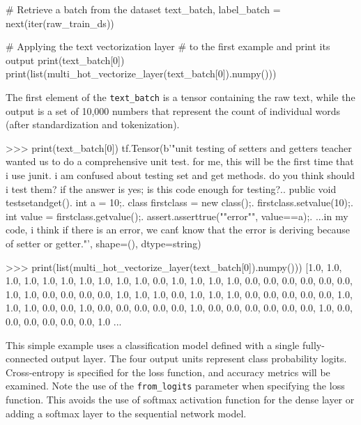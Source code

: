\begin{samepage}
\begin{pythoncode}
# Retrieve a batch from the dataset
text_batch, label_batch = next(iter(raw_train_ds))

# Applying the text vectorization layer
# to the first example and print its output
print(text_batch[0])
print(list(multi_hot_vectorize_layer(text_batch[0]).numpy()))
\end{pythoncode}
\end{samepage}

The first element of the \texttt{text\_batch} is a tensor containing the raw text, while the output is a set of 10,000 numbers that represent the count of individual words (after standardization and tokenization).

\begin{samepage}
\begin{textcode}
>>> print(text_batch[0])
tf.Tensor(b'"unit testing of setters and getters teacher wanted us 
to do a comprehensive unit test. for me, this will be the first time 
that i use junit. i am confused about testing set and get methods. 
do you think should i test them? if the answer is yes; is this code 
enough for testing?..  public void testsetandget(){.    int a = 10;.    
class firstclass = new class();.    firstclass.setvalue(10);.    int
value = firstclass.getvalue();.    assert.asserttrue(""error"", 
value==a);.  }...in my code, i think if there is an error, we can\'t
know that the error is deriving because of setter or getter."\n', 
shape=(), dtype=string)

>>> print(list(multi_hot_vectorize_layer(text_batch[0]).numpy()))
[1.0, 1.0, 1.0, 1.0, 1.0, 1.0, 1.0, 1.0, 1.0, 1.0, 0.0, 1.0, 1.0, 
1.0, 1.0, 0.0, 0.0, 0.0, 0.0, 0.0, 0.0, 1.0, 1.0, 0.0, 0.0, 0.0, 
0.0, 1.0, 1.0, 1.0, 0.0, 1.0, 1.0, 1.0, 0.0, 0.0, 0.0, 0.0, 0.0, 
1.0, 1.0, 1.0, 0.0, 0.0, 1.0, 0.0, 0.0, 0.0, 0.0, 0.0, 1.0, 0.0, 
0.0, 0.0, 0.0, 0.0, 0.0, 1.0, 0.0, 0.0, 0.0, 0.0, 0.0, 0.0, 1.0
...
\end{textcode}
\end{samepage}

This simple example uses a classification model defined with a single fully-connected output layer. The four output units represent class probability logits. Cross-entropy is specified for the loss function, and accuracy metrics will be examined. Note the use of the \texttt{from\_logits} parameter when specifying the loss function. This avoids the use of softmax activation function for the dense layer or adding a softmax layer to the sequential network model.

